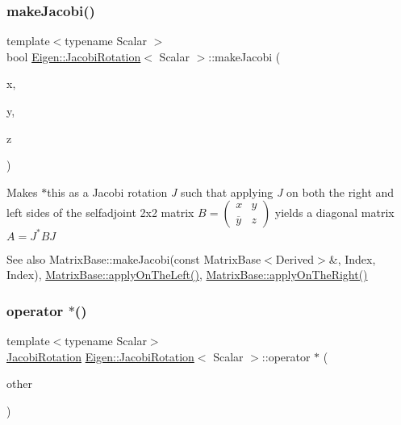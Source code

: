 \subsubsection{\texorpdfstring{makeJacobi()}{makeJacobi()}\hspace{0.1cm}{\footnotesize\ttfamily [2/2]}}
{\footnotesize\ttfamily template$<$typename Scalar $>$ \\
bool \mbox{\hyperlink{class_eigen_1_1_jacobi_rotation}{Eigen\+::\+Jacobi\+Rotation}}$<$ Scalar $>$\+::make\+Jacobi (\begin{DoxyParamCaption}\item[{const Real\+Scalar \&}]{x,  }\item[{const Scalar \&}]{y,  }\item[{const Real\+Scalar \&}]{z }\end{DoxyParamCaption})}

Makes {\ttfamily $\ast$this} as a Jacobi rotation {\itshape J} such that applying {\itshape J} on both the right and left sides of the selfadjoint 2x2 matrix $ B = \left ( \begin{array}{cc} x & y \\ \overline y & z \end{array} \right )$ yields a diagonal matrix $ A = J^* B J $

\begin{DoxySeeAlso}{See also}
Matrix\+Base\+::make\+Jacobi(const Matrix\+Base$<$\+Derived$>$\&, Index, Index), \mbox{\hyperlink{class_eigen_1_1_matrix_base_a3a08ad41e81d8ad4a37b5d5c7490e765}{Matrix\+Base\+::apply\+On\+The\+Left()}}, \mbox{\hyperlink{class_eigen_1_1_matrix_base_a45d91752925d2757fc8058a293b15462}{Matrix\+Base\+::apply\+On\+The\+Right()}} 
\end{DoxySeeAlso}
\mbox{\label{class_eigen_1_1_jacobi_rotation_a3a9d07201435273f6e001592fc547dcb}} 
\subsubsection{\texorpdfstring{operator $\ast$()}{operator *()}}
{\footnotesize\ttfamily template$<$typename Scalar$>$ \\
\mbox{\hyperlink{class_eigen_1_1_jacobi_rotation}{Jacobi\+Rotation}} \mbox{\hyperlink{class_eigen_1_1_jacobi_rotation}{Eigen\+::\+Jacobi\+Rotation}}$<$ Scalar $>$\+::operator $\ast$ (\begin{DoxyParamCaption}\item[{const \mbox{\hyperlink{class_eigen_1_1_jacobi_rotation}{Jacobi\+Rotation}}$<$ Scalar $>$ \&}]{other }\end{DoxyParamCaption})\hspace{0.3cm}{\ttfamily [inline]}}

